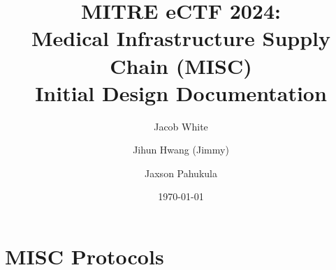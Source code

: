 \documentclass{article}
\title{MITRE eCTF 2024:\\ \Large Medical Infrastructure Supply Chain (MISC)\\Initial Design Documentation}
\author{\large Jacob White}
\author{\large Jihun Hwang (Jimmy)}
\author{\large Jaxson Pahukula}
\affil{\normalsize Purdue University (\texttt{b01lers})}
\date{\small \today}
\newif\iflong
\newcommand{\jw}[1]{\iflong\textcolor{Purple}{#1 ---Jacob}\fi}
\begin{document}
\maketitle














\section{MISC Protocols}










% 

\newpage



\newpage

\end{document}
